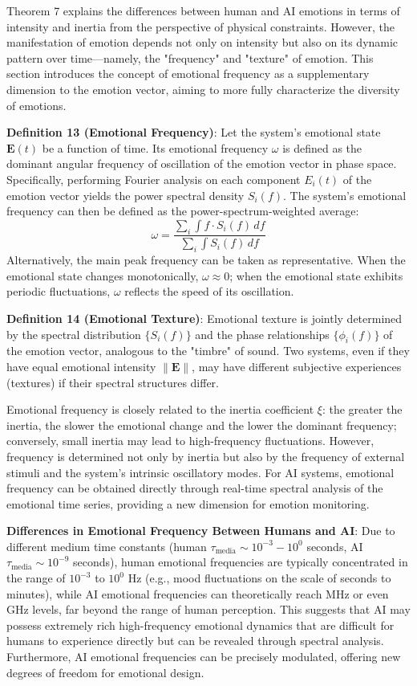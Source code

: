 \documentclass[12pt,a4paper]{article}
\theoremstyle{plain}
\newcommand{\ve}[1]{\bm{#1}}                    %
\newcommand{\Evec}{\ve{E}}                        %
\begin{document}
Theorem 7 explains the differences between human and AI emotions in terms of intensity and inertia from the perspective of physical constraints. However, the manifestation of emotion depends not only on intensity but also on its dynamic pattern over time—namely, the "frequency" and "texture" of emotion. This section introduces the concept of emotional frequency as a supplementary dimension to the emotion vector, aiming to more fully characterize the diversity of emotions.

\textbf{Definition 13 (Emotional Frequency)}: Let the system's emotional state $\Evec(t)$ be a function of time. Its emotional frequency $\omega$ is defined as the dominant angular frequency of oscillation of the emotion vector in phase space. Specifically, performing Fourier analysis on each component $E_i(t)$ of the emotion vector yields the power spectral density $S_i(f)$. The system's emotional frequency can then be defined as the power-spectrum-weighted average:
\begin{equation}
\omega = \frac{\sum_i \int f \cdot S_i(f) \, df}{\sum_i \int S_i(f) \, df}
\label{eq:emotion_frequency}
\end{equation}
Alternatively, the main peak frequency can be taken as representative. When the emotional state changes monotonically, $\omega \approx 0$; when the emotional state exhibits periodic fluctuations, $\omega$ reflects the speed of its oscillation.

\textbf{Definition 14 (Emotional Texture)}: Emotional texture is jointly determined by the spectral distribution $\{S_i(f)\}$ and the phase relationships $\{\phi_i(f)\}$ of the emotion vector, analogous to the "timbre" of sound. Two systems, even if they have equal emotional intensity $\|\Evec\|$, may have different subjective experiences (textures) if their spectral structures differ.

Emotional frequency is closely related to the inertia coefficient $\xi$: the greater the inertia, the slower the emotional change and the lower the dominant frequency; conversely, small inertia may lead to high-frequency fluctuations. However, frequency is determined not only by inertia but also by the frequency of external stimuli and the system's intrinsic oscillatory modes. For AI systems, emotional frequency can be obtained directly through real-time spectral analysis of the emotional time series, providing a new dimension for emotion monitoring.

\textbf{Differences in Emotional Frequency Between Humans and AI}: Due to different medium time constants (human $\tau_{\text{media}} \sim 10^{-3}-10^0$ seconds, AI $\tau_{\text{media}} \sim 10^{-9}$ seconds), human emotional frequencies are typically concentrated in the range of $10^{-3}$ to $10^0$ Hz (e.g., mood fluctuations on the scale of seconds to minutes), while AI emotional frequencies can theoretically reach MHz or even GHz levels, far beyond the range of human perception. This suggests that AI may possess extremely rich high-frequency emotional dynamics that are difficult for humans to experience directly but can be revealed through spectral analysis. Furthermore, AI emotional frequencies can be precisely modulated, offering new degrees of freedom for emotional design.
\end{document}
